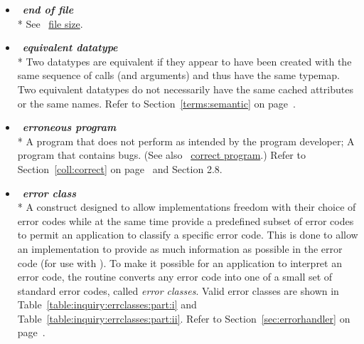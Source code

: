 \begin{itemize}
\label{glossary:end_of_file}
\item  ~\hypertarget{glossary:end_of_file}{\emph{\textbf{end of file}}} \\*
See ~\hyperlink{glossary:file_size}{file size}.

\label{glossary:equivalent_datatype}
\item  ~\hypertarget{glossary:equivalent_datatype}{\emph{\textbf{equivalent datatype}}} \\*
Two datatypes are equivalent if they appear to have been created with
the same sequence of calls (and arguments) and thus have the same
typemap.  Two equivalent datatypes do not necessarily have the same
cached attributes or the same names.
Refer to Section~\ref{terms:semantic} on page~\pageref{terms:semantic}.

\label{glossary:erroneous_program}
\item  ~\hypertarget{glossary:erroneous_program}{\emph{\textbf{erroneous program}}} \\*
A program that does not perform as intended by the program developer; A program that contains bugs. 
(See also ~\hyperlink{glossary:correct_program}{correct program}.)
Refer to Section~\ref{coll:correct} on page~\pageref{coll:correct} and
Section 2.8.

\label{glossary:error_class}
\item  ~\hypertarget{glossary:error_class}{\emph{\textbf{error class}}} \\*
A construct designed to allow implementations freedom with their choice
of error codes while at the same time provide a predefined subset of error
codes to permit an application to classify a specific error code.
This is done to allow an implementation to
provide as much information as possible in the error code (for use with
).
To make it possible for an application to interpret an error code, the routine
converts any error code into one of a small set of standard error
codes, called {\em error classes}.  
Valid error classes are shown in Table~\ref{table:inquiry:errclasses:part:i}
and Table~\ref{table:inquiry:errclasses:part:ii}. 
Refer to Section~\ref{sec:errorhandler} on page~\pageref{sec:errorhandler}.


\end{itemize}
